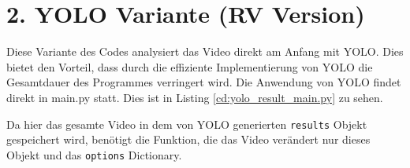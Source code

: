 \section{2. YOLO Variante (RV Version)}{
	\label{py:YOLO_res_vers}
	Diese Variante des Codes analysiert das Video direkt am Anfang mit YOLO. Dies bietet den Vorteil, dass durch die effiziente Implementierung von YOLO die Gesamtdauer des Programmes verringert wird. Die Anwendung von YOLO findet direkt in main.py statt. Dies ist in Listing \ref{cd:yolo_result_main.py} zu sehen.
	
	Da hier das gesamte Video in dem von YOLO generierten \lstinline|results| Objekt gespeichert wird, benötigt die Funktion, die das Video verändert nur dieses Objekt und das \lstinline|options| Dictionary. \\
	

}

